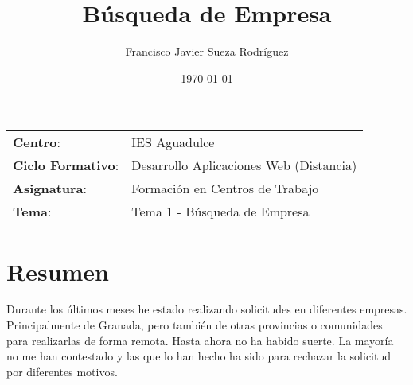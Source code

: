 


\title{
\vspace{10ex}
\normalfont \normalsize
\huge \textbf{Búsqueda de Empresa}
}
\author{Francisco Javier Sueza Rodríguez}
\date{\normalsize\today}




\maketitle

\thispagestyle{empty}

\vspace{75ex}

\begin{center}
    \begin{tabular}{l l}
        \textbf{Centro}: & IES Aguadulce \\
        \textbf{Ciclo Formativo}: & Desarrollo Aplicaciones Web (Distancia)\\
        \textbf{Asignatura}: & Formación en Centros de Trabajo\\
        \textbf{Tema}: & Tema 1 - Búsqueda de Empresa\\
    \end{tabular}
\end{center}

\newpage

\tableofcontents

\newpage

\section{Resumen}
Durante los últimos meses he estado realizando solicitudes en diferentes empresas. Principalmente de Granada, pero también de otras provincias o comunidades para realizarlas de forma remota. Hasta ahora no ha habido suerte. La mayoría no me han contestado y las que lo han hecho ha sido para rechazar la solicitud por diferentes motivos.

